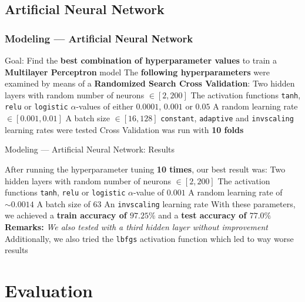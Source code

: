 \documentclass[10pt, aspectratio=169]{beamer}
\begin{document}
\subsection{Artificial Neural Network}
\begin{frame}
    \frametitle{Modeling --- Artificial Neural Network}
    \begin{outline}
        \1 Goal: Find the \textbf{best combination of hyperparameter values} to train a \textbf{Multilayer Perceptron} model
        \1 The \textbf{following hyperparameters} were examined by means of a \textbf{Randomized Search Cross Validation}:
            \2 Two hidden layers with random number of neurons $\in[2, 200]$
            \2 The activation functions \texttt{tanh}, \texttt{relu} or \texttt{logistic}
            \2 $\alpha$-values of either $0.0001$, $0.001$ or $0.05$
            \2 A random learning rate $\in[0.001, 0.01]$
            \2 A batch size $\in[16, 128]$
            \2 \texttt{constant}, \texttt{adaptive} and \texttt{invscaling} learning rates were tested
        \1 Cross Validation was run with \textbf{10 folds}
    \end{outline}   
\end{frame}
\begin{frame}{Modeling --- Artificial Neural Network: Results}
    \begin{outline}
        \1 After running the hyperparameter tuning \textbf{10 times}, our best result was:
            \2 Two hidden layers with random number of neurons $\in[2, 200]$
            \2 The activation functions \texttt{tanh}, \texttt{relu} or \texttt{logistic}
            \2 $\alpha$-value of $0.001$
            \2 A random learning rate of $\sim 0.0014$
            \2 A batch size of $63$
            \2 An \texttt{invscaling} learning rate
        \1 With these parameters, we achieved a \textbf{train accuracy of $\mathbf{97.25\%}$} and a \textbf{test accuracy of $\mathbf{77.0\%}$}
        \1 \textbf{Remarks:}
            \2 \textit{We also tested with a third hidden layer without improvement}
            \2 Additionally, we also tried the \texttt{lbfgs} activation function which led to way worse results
    \end{outline}
\end{frame}

\section{Evaluation}
\end{document}
